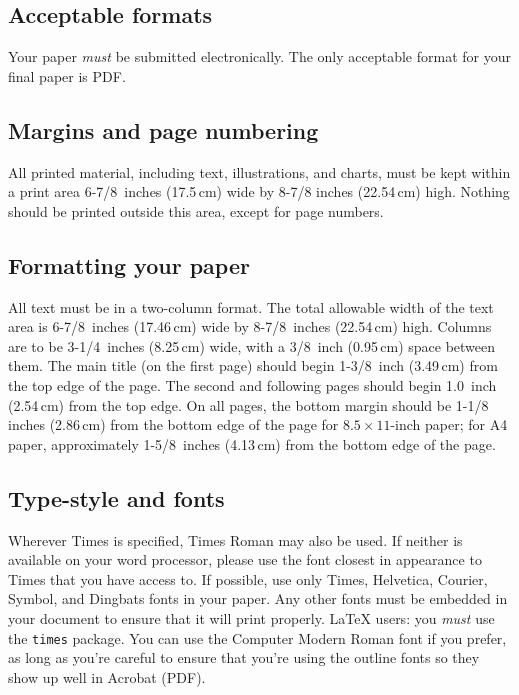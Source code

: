 \documentclass[10pt,twocolumn]{article}
\newcommand{\latex}{\LaTeX\xspace}
\begin{document}
\subsection{Acceptable formats}

Your paper \emph{must} be submitted electronically.  The only acceptable
format for your final paper is PDF.

\subsection{Margins and page numbering}

All printed material, including text, illustrations, and charts, must
be kept within a print area 6-7/8~inches (17.5\,cm) wide by 8-7/8
inches (22.54\,cm) high.  Nothing should be printed outside this area,
except for page numbers.

\subsection{Formatting your paper}

All text must be in a two-column format. The total allowable width of
the text area is 6-7/8~inches (17.46\,cm) wide by 8-7/8~inches
(22.54\,cm) high. Columns are to be 3-1/4~inches (8.25\,cm) wide, with
a 3/8~inch (0.95\,cm) space between them. The main title (on the first
page) should begin 1-3/8~inch (3.49\,cm) from the top edge of the
page. The second and following pages should begin 1.0~inch (2.54\,cm)
from the top edge. On all pages, the bottom margin should be 1-1/8
inches (2.86\,cm) from the bottom edge of the page for $8.5 \times
11$-inch paper; for A4 paper, approximately 1-5/8~inches (4.13\,cm)
from the bottom edge of the page.

\subsection{Type-style and fonts}

Wherever Times is specified, Times Roman may also be used. If neither
is available on your word processor, please use the font closest in
appearance to Times that you have access to.  If possible, use only
Times, Helvetica, Courier, Symbol, and Dingbats fonts in your paper.
Any other fonts must be embedded in your document to ensure that it
will print properly.  \latex users: you \emph{must} use the
\texttt{times} package.  You can use the Computer Modern Roman font
if you prefer, as long as you're careful to ensure that you're using
the outline fonts so they show up well in Acrobat (PDF).
\end{document}
